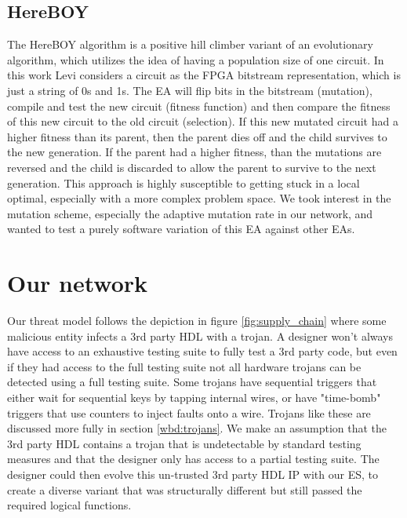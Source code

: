 \documentclass[conference]{IEEEtran}
\begin{document}
{\subsection{HereBOY}
\label{ea:hereboy}
\par The HereBOY algorithm is a positive hill climber variant of an evolutionary algorithm, which utilizes the idea of having a population size of one circuit\cite{levi2000hereboy}. 
In this work Levi considers a circuit as the FPGA bitstream representation, which is just a string of 0s and 1s. 
The EA will flip bits in the bitstream (mutation), compile and test the new circuit (fitness function) and then compare the fitness of this new circuit to the old circuit (selection).
If this new mutated circuit had a higher fitness than its parent, then the parent dies off and the child survives to the new generation.
If the parent had a higher fitness, than the mutations are reversed and the child is discarded to allow the parent to survive to the next generation.
This approach is highly susceptible to getting stuck in a local optimal, especially with a more complex problem space.
We took interest in the mutation scheme, especially the adaptive mutation rate in our network, and wanted to test a purely software variation of this EA against other EAs.


\section{Our network}
\label{net:intro}
\par Our threat model follows the depiction in figure \ref{fig:supply_chain} where some malicious entity infects a 3rd party HDL with a trojan.
A designer won't always have access to an exhaustive testing suite to fully test a 3rd party code, but even if they had access to the full testing suite not all hardware trojans can be detected using a full testing suite.
Some trojans have sequential triggers that either wait for sequential keys by tapping internal wires, or have "time-bomb" triggers that use counters to inject faults onto a wire. 
Trojans like these are discussed more fully in section \ref{wbd:trojans}.
We make an assumption that the 3rd party HDL contains a trojan that is undetectable by standard testing measures and that the designer only has access to a partial testing suite.
The designer could then evolve this un-trusted 3rd party HDL IP with our ES, to create a diverse variant that was structurally different but still passed the required logical functions. 

}
\end{document}
